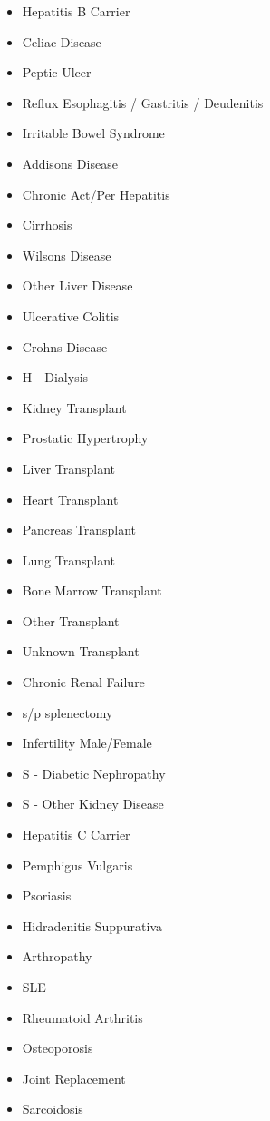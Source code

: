 \documentclass[a4paper,12pt]{article}
\begin{document}
\begin{appendices}
\begin{itemize}
   			\item Hepatitis B Carrier
   			\item Celiac Disease
   			\item Peptic Ulcer
   			\item Reflux Esophagitis / Gastritis / Deudenitis
   			\item Irritable Bowel Syndrome
   			\item Addisons Disease
   			\item Chronic Act/Per Hepatitis
   			\item Cirrhosis
   			\item Wilsons Disease
   			\item Other Liver Disease
   			\item Ulcerative Colitis
   			\item Crohns Disease
   			\item H - Dialysis
   			\item Kidney Transplant
   			\item Prostatic Hypertrophy
   			\item Liver Transplant
   			\item Heart Transplant
   			\item Pancreas Transplant
   			\item Lung Transplant
   			\item Bone Marrow Transplant
   			\item Other Transplant
   			\item Unknown Transplant
   			\item Chronic Renal Failure
   			\item s/p splenectomy
   			\item Infertility Male/Female
   			\item S - Diabetic Nephropathy
   			\item S - Other Kidney Disease
   			\item Hepatitis C Carrier
   			\item Pemphigus Vulgaris
   			\item Psoriasis
   			\item Hidradenitis Suppurativa
   			\item Arthropathy
   			\item SLE
   			\item Rheumatoid Arthritis
   			\item Osteoporosis
   			\item Joint Replacement
   			\item Sarcoidosis

\end{itemize}
\end{appendices}
\end{document}
